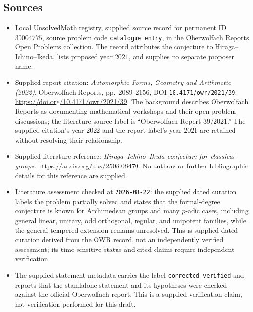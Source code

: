 \documentclass[11pt]{article}
\begin{document}
\subsection{Sources}
\begin{itemize}
\item Local UnsolvedMath registry, supplied source record for permanent ID \(30004775\), source problem code \texttt{catalogue entry}, in the Oberwolfach Reports Open Problems collection. The record attributes the conjecture to Hiraga--Ichino--Ikeda, lists proposed year \(2021\), and supplies no separate proposer name.
\item Supplied report citation: \emph{Automorphic Forms, Geometry and Arithmetic (2022)}, Oberwolfach Reports, pp.\ 2089--2156, DOI \texttt{10.4171/owr/2021/39}. \url{https://doi.org/10.4171/owr/2021/39}. The background describes Oberwolfach Reports as documenting mathematical workshops and their open-problem discussions; the literature-source label is ``Oberwolfach Report 39/2021.'' The supplied citation's year \(2022\) and the report label's year \(2021\) are retained without resolving their relationship.
\item Supplied literature reference: \emph{Hiraga--Ichino--Ikeda conjecture for classical groups}. \url{https://arxiv.org/abs/2508.08470}. No authors or further bibliographic details for this reference are supplied.
\item Literature assessment checked at \texttt{2026-08-22}: the supplied dated curation labels the problem partially solved and states that the formal-degree conjecture is known for Archimedean groups and many \(p\)-adic cases, including general linear, unitary, odd orthogonal, regular, and unipotent families, while the general tempered extension remains unresolved. This is supplied dated curation derived from the OWR record, not an independently verified assessment; its time-sensitive status and cited claims require independent verification.
\item The supplied statement metadata carries the label \texttt{corrected\_verified} and reports that the standalone statement and its hypotheses were checked against the official Oberwolfach report. This is a supplied verification claim, not verification performed for this draft.
\end{itemize}
\end{document}
